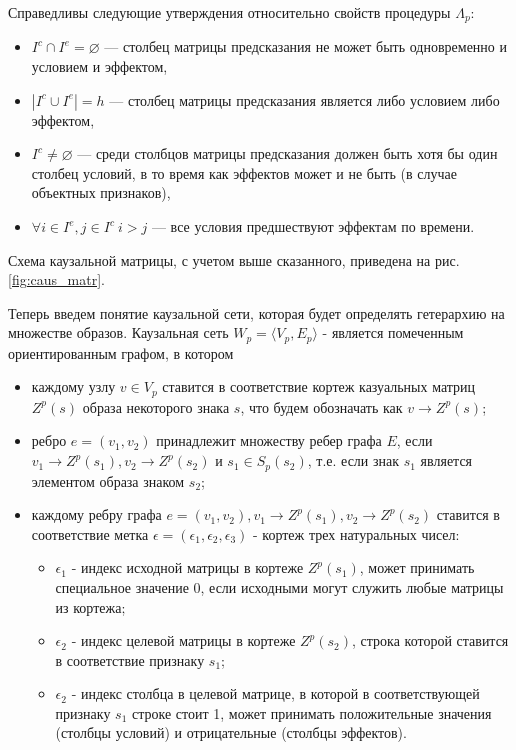 \documentclass[12pt]{scrartcl}
\begin{document}
	Справедливы следующие утверждения относительно свойств процедуры $\Lambda_p$:
	\begin{itemize}
		\item $I^c\cap I^e=\varnothing$ --- столбец матрицы предсказания не может быть одновременно и условием и эффектом,
		\item $|I^c\cup I^e|=h$ --- столбец матрицы предсказания является либо условием либо эффектом,
		\item $I^c\not = \varnothing$ --- среди столбцов матрицы предсказания должен быть хотя бы один столбец условий, в то время как эффектов может и не быть (в случае объектных признаков),
		\item $\forall i\in I^e, j\in I^c\ i>j$ --- все условия предшествуют эффектам по времени.
	\end{itemize}
	
	Схема каузальной матрицы, с учетом выше сказанного, приведена на рис. \ref{fig:caus_matr}.
	
	Теперь введем понятие каузальной сети, которая будет определять гетерархию на множестве образов. Каузальная сеть $W_p=\langle V_p, E_p \rangle$ - является помеченным ориентированным графом, в котором
	\begin{itemize}
		\item каждому узлу $v\in V_p$ ставится в соответствие кортеж казуальных матриц $Z^p(s)$ образа некоторого знака $s$, что будем обозначать как $v\rightarrow Z^p(s)$;
		\item ребро $e=(v_1, v_2)$ принадлежит множеству ребер графа $E$, если $v_1\rightarrow Z^p(s_1), v_2\rightarrow Z^p(s_2)$ и $s_1\in S_p(s_2)$, т.е. если знак $s_1$ является элементом образа знаком $s_2$;
		\item каждому ребру графа $e=(v_1, v_2), v_1\rightarrow Z^p(s_1), v_2\rightarrow Z^p(s_2)$ ставится в соответствие метка $\epsilon=(\epsilon_1,\epsilon_2,\epsilon_3)$ - кортеж трех натуральных чисел:
		\begin{itemize}
			\item $\epsilon_1$ - индекс исходной матрицы в кортеже $Z^p(s_1)$, может принимать специальное значение 0, если исходными могут служить любые матрицы из кортежа;
			\item $\epsilon_2$ - индекс целевой матрицы в кортеже $Z^p(s_2)$, строка которой ставится в соответствие признаку $s_1$;
			\item $\epsilon_2$ - индекс столбца в целевой матрице, в которой в соответствующей признаку $s_1$ строке стоит 1, может принимать положительные значения (столбцы условий) и отрицательные (столбцы эффектов).
		\end{itemize}		
	\end{itemize}
	
\end{document}
